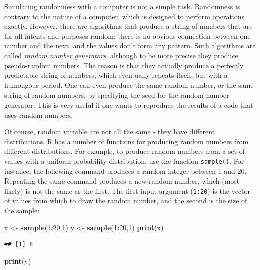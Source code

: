 \documentclass[
]{book}
\newenvironment{Shaded}{\begin{snugshade}}{\end{snugshade}}
\newcommand{\DecValTok}[1]{\textcolor[rgb]{0.00,0.00,0.81}{#1}}
\newcommand{\KeywordTok}[1]{\textcolor[rgb]{0.13,0.29,0.53}{\textbf{#1}}}
\newcommand{\NormalTok}[1]{#1}
\newcommand{\OperatorTok}[1]{\textcolor[rgb]{0.81,0.36,0.00}{\textbf{#1}}}
\newcommand{\StringTok}[1]{\textcolor[rgb]{0.31,0.60,0.02}{#1}}
\theoremstyle{definition}
\theoremstyle{definition}
\theoremstyle{definition}
\theoremstyle{remark}
\begin{document}
\label{sec:comp4}

Simulating randomness with a computer is not a simple task. Randomness is contrary to the nature of a computer, which is designed to perform operations exactly. However, there are algorithms that produce a string of numbers that are for all intents and purposes random: there is no obvious connection between one number and the next, and the values don't form any pattern. Such algorithms are called \emph{random number generators}, although to be more precise they produce pseudo-random numbers. The reason is that they actually produce a perfectly predictable string of numbers, which eventually repeats itself, but with a humongous period. One can even produce the same random number, or the same string of random numbers, by specifying the seed for the random number generator. This is very useful if one wants to reproduce the results of a code that uses random numbers.

Of course, random variable are not all the same - they have different distributions. R has a number of functions for producing random numbers from different distributions. For example, to produce random numbers from a set of values with a uniform probability distribution, use the function \texttt{sample()}. For instance, the following command produces a random integer between 1 and 20. Repeating the same command produces a new random number, which (most likely) is not the same as the first. The first input argument (\texttt{1:20}) is the vector of values from which to draw the random number, and the second is the size of the sample:

\begin{Shaded}
\begin{Highlighting}[]
\NormalTok{x \textless{}{-}}\StringTok{ }\KeywordTok{sample}\NormalTok{(}\DecValTok{1}\OperatorTok{:}\DecValTok{20}\NormalTok{,}\DecValTok{1}\NormalTok{)}
\NormalTok{y \textless{}{-}}\StringTok{ }\KeywordTok{sample}\NormalTok{(}\DecValTok{1}\OperatorTok{:}\DecValTok{20}\NormalTok{,}\DecValTok{1}\NormalTok{)}
\KeywordTok{print}\NormalTok{(x)}
\end{Highlighting}
\end{Shaded}

\begin{verbatim}
## [1] 8
\end{verbatim}

\begin{Shaded}
\begin{Highlighting}[]
\KeywordTok{print}\NormalTok{(y)}
\end{Highlighting}
\end{Shaded}
\end{document}
